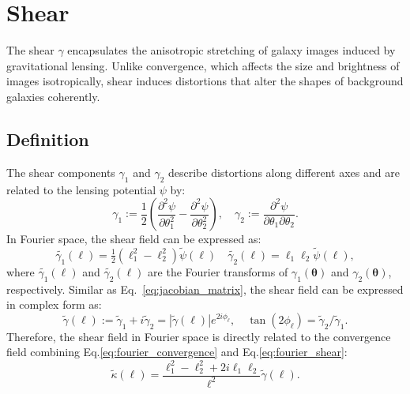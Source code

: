 \section{Shear}
The shear $\gamma$ encapsulates the anisotropic stretching of galaxy images induced by gravitational lensing. Unlike convergence, which affects the size and brightness of images isotropically, shear induces distortions that alter the shapes of background galaxies coherently. 
\subsection{Definition}
The shear components $\gamma_1$ and $\gamma_2$ describe distortions along different axes and are related to the lensing potential $\psi$ by:
\begin{equation}
    \label{eq:physical_shear}
    \gamma_1 := \frac{1}{2} \left( \frac{\partial^2 \psi}{\partial \theta_1^2} - \frac{\partial^2 \psi}{\partial \theta_2^2} \right), \quad \gamma_2 := \frac{\partial^2 \psi}{\partial \theta_1 \partial \theta_2}.
\end{equation}
In Fourier space, the shear field can be expressed as:
\begin{equation}
    \label{eq:fourier_shear}
    \tilde{\gamma_1}(\boldsymbol{\ell}) = \tfrac{1}{2} \left( \ell_1^2 - \ell_2^2 \right) \tilde{\psi}(\boldsymbol{\ell}) \quad
    \tilde{\gamma_2}(\boldsymbol{\ell}) = \ell_1 \ell_2 \tilde{\psi}(\boldsymbol{\ell}) ,
\end{equation}
where $\tilde{\gamma_1}(\boldsymbol{\ell})$ and $\tilde{\gamma_2}(\boldsymbol{\ell})$ are the Fourier transforms of $\gamma_1(\boldsymbol{\theta})$ and $\gamma_2(\boldsymbol{\theta})$, respectively. 
Similar as Eq.~\eqref{eq:jacobian_matrix}, the shear field can be expressed in complex form as:
\begin{equation}
    \label{eq:fourier_shear1}
    \tilde{\gamma}(\boldsymbol{\ell}) := \tilde{\gamma}_1 + i\tilde{\gamma}_2 = |\tilde{\gamma}(\boldsymbol{\ell})|e^{2i\phi_\ell}, \quad \tan (2\phi_\ell) = \tilde{\gamma}_2 / \tilde{\gamma}_1.
\end{equation}
Therefore, the shear field in Fourier space is directly related to the convergence field combining Eq.\eqref{eq:fourier_convergence} and Eq.\eqref{eq:fourier_shear}:
\begin{equation}
    \tilde{\kappa}(\boldsymbol{\ell}) = \frac{\ell_1^2 - \ell_2^2 + 2i\ell_1\ell_2}{\ell^2} \tilde{\gamma}(\boldsymbol{\ell}).
    \label{eq:kappa_gamma_relation}
\end{equation}
